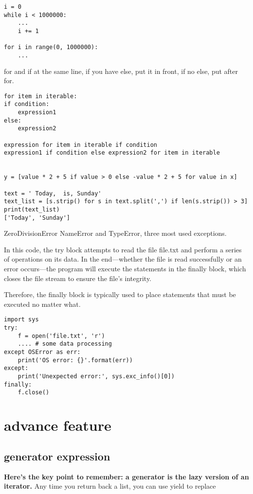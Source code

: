 \documentclass[a4paper,12pt,twoside]{book}
\begin{document}
\begin{lstlisting}
i = 0
while i < 1000000: 
	...
	i += 1
	
for i in range(0, 1000000):
	...
\end{lstlisting}

for and if at the same line, if you have else, put it in front, if no else, put after for.

\begin{lstlisting}
for item in iterable:
if condition:
	expression1
else:
	expression2	
	
expression for item in iterable if condition
expression1 if condition else expression2 for item in iterable

	
y = [value * 2 + 5 if value > 0 else -value * 2 + 5 for value in x]

text = ' Today,  is, Sunday'
text_list = [s.strip() for s in text.split(',') if len(s.strip()) > 3]
print(text_list)
['Today', 'Sunday']
\end{lstlisting}

ZeroDivisionError NameError and TypeError, three most used exceptions.

In this code, the try block attempts to read the file file.txt and perform a series of operations on its data. In the end—whether the file is read successfully or an error occurs—the program will execute the statements in the finally block, which closes the file stream to ensure the file’s integrity.

Therefore, the finally block is typically used to place statements that must be executed no matter what.

\begin{lstlisting}
import sys
try:
	f = open('file.txt', 'r')
	.... # some data processing
except OSError as err:
	print('OS error: {}'.format(err))
except:
	print('Unexpected error:', sys.exc_info()[0])
finally:
	f.close()
\end{lstlisting}


	
\section{advance feature}
\subsection{generator expression}
\textbf{Here’s the key point to remember: a generator is the lazy version of an iterator.} Any time you return back a list, you can use yield to replace
\end{document}
